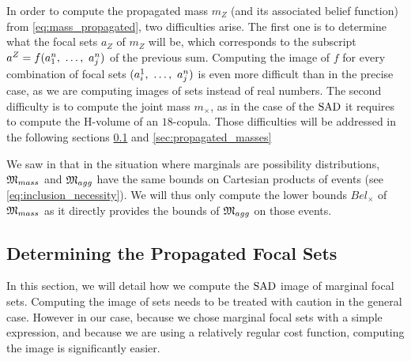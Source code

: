 In order to compute the propagated mass $m_Z$ (and its associated belief function) from \cref{eq:mass_propagated}, two difficulties arise. The first one is to determine what the focal sets $a_Z$ of $m_Z$ will be, which corresponds to the subscript $a^Z=f(a^n_1 , ~\dots, ~  a^n_j)$ of the previous sum. Computing the image of $f$ for every combination of focal sets $(a^1_i , ~\dots, ~ a^n_j)$ is even more difficult than in the precise case, as we are computing images of sets instead of real numbers. The second difficulty is to compute the joint mass $m_\times$, as in the case of the $\mathrm{SAD}$ it requires to compute the H-volume of an $18$-copula. Those difficulties will be addressed in the following sections \ref{sec:propagated_focal_sets} and \ref{sec:propagated_masses}

We saw in  that in the situation where marginals are possibility distributions, $\mathfrak{M}_{mass}$ and $\mathfrak{M}_{agg}$ have the same bounds on Cartesian products of events (see \cref{eq:inclusion_necessity}). We will thus only compute the lower bounds $Bel_\times$ of $\mathfrak{M}_{mass}$ as it directly provides the bounds of $\mathfrak{M}_{agg}$ on those events.

\subsection{Determining the Propagated Focal Sets}\label{sec:propagated_focal_sets}
In this section, we will detail how we compute the $\mathrm{SAD}$ image of marginal focal sets. Computing the image of sets needs to be treated with caution in the general case. However in our case, because we chose marginal focal sets with a simple expression, and because we are using a relatively regular cost function, computing the image is significantly easier.

